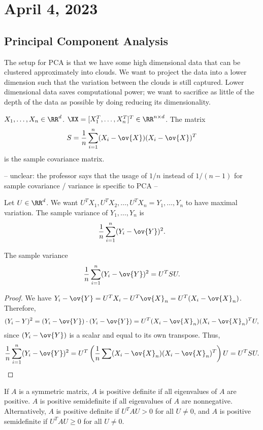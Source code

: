 \section{April 4, 2023}

\subsection{Principal Component Analysis}

The setup for PCA is that we have some high dimensional data that can be clustered approximately into clouds. We want to project the data into a lower dimension such that the variation between the clouds is still captured. Lower dimensional data saves computational power; we want to sacrifice as little of the depth of the data as possible by doing reducing its dimensionality. 

\hrulebar

$X_1, \hdots, X_n\in \RR^d$. $\XX=[X_1^T, \hdots, X_n^T]^T\in \RR^{n\times d}$. The matrix
\[S = \frac{1}{n}\sum_{i=1}^n(X_i-\ov{X})(X_i-\ov{X})^T\]
is the sample covariance matrix. 

-- unclear: the professor says that the usage of $1/n$ instead of $1/(n-1)$ for sample covariance / variance is specific to PCA --

Let $U\in \RR^d$. We want $U^TX_1, U^TX_2, \hdots, U^TX_n = Y_1, \hdots, Y_n$ to have maximal variation. The sample variance of $Y_1, \hdots, Y_n$ is 
\[\frac{1}{n}\sum_{i=1}^n(Y_i-\ov{Y})^2.\]

\begin{theorem}
\claimlabel

The sample variance 
\[\frac{1}{n}\sum_{i=1}^n (Y_i-\ov{Y})^2 = U^TSU.\]
\end{theorem}

\begin{proof}
We have $Y_i-\ov{Y} = U^TX_i-U^T\ov{X}_n = U^T(X_i-\ov{X}_n)$. Therefore, \[(Y_i-Y)^2 = (Y_i-\ov{Y})\cdot (Y_i-\ov{Y}) = U^T(X_i-\ov{X}_n)(X_i-\ov{X}_n)^TU,\]
since $(Y_i-\ov{Y})$ is a scalar and equal to its own transpose. Thus, 
\begin{align*}
    \frac{1}{n}\sum_{i=1}^n(Y_i-\ov{Y})^2 = U^T\left(\frac{1}{n}\sum (X_i-\ov{X}_n)(X_i-\ov{X}_n)^T\right)U = U^TSU. 
\end{align*}
\end{proof}

\begin{definition}

If $A$ is a symmetric matrix, $A$ is positive definite if all eigenvalues of $A$ are positive. $A$ is positive semidefinite if all eigenvalues of $A$ are nonnegative. Alternatively, $A$ is positive definite if $U^TAU > 0$ for all $U\neq 0$, and $A$ is positive semidefinite if $U^TAU\geq 0$ for all $U\neq 0$. 
\end{definition}

